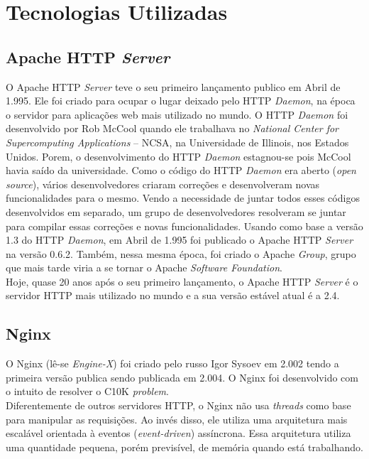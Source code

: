 \chapter{Tecnologias Utilizadas}\label{tecnologias_utilizadas}

\section{Apache HTTP \textit{Server}}
O Apache HTTP \textit{Server} teve o seu primeiro lançamento publico em Abril de 1.995. Ele foi criado para ocupar o lugar deixado pelo HTTP \textit{Daemon}, na época o servidor para aplicações web mais utilizado no mundo. O HTTP \textit{Daemon} foi desenvolvido por Rob McCool quando ele trabalhava no \textit{National Center for Supercomputing Applications} – NCSA, na Universidade de Illinois, nos Estados Unidos. Porem, o desenvolvimento do HTTP \textit{Daemon} estagnou-se pois McCool havia saído da universidade. Como o código do HTTP \textit{Daemon} era aberto (\textit{open source}), vários desenvolvedores criaram correções e desenvolveram novas funcionalidades para o mesmo. Vendo a necessidade de juntar todos esses códigos desenvolvidos em separado, um grupo de desenvolvedores resolveram se juntar para compilar essas correções e novas funcionalidades. Usando como base a versão 1.3 do HTTP \textit{Daemon}, em Abril de 1.995 foi publicado o Apache HTTP \textit{Server} na versão 0.6.2. Também, nessa mesma época, foi criado o Apache \textit{Group}, grupo que mais tarde viria a se tornar o Apache \textit{Software Foundation}.\\
Hoje, quase 20 anos após o seu primeiro lançamento, o Apache HTTP \textit{Server} é o servidor HTTP mais utilizado no mundo e a sua versão estável atual é a 2.4.\\

\section{Nginx}
O Nginx (lê-se \textit{Engine-X}) foi criado pelo russo Igor Sysoev em 2.002 tendo a primeira versão publica sendo publicada em 2.004. O Nginx foi desenvolvido com o intuito de resolver o C10K \textit{problem}.\\
Diferentemente de outros servidores HTTP, o Nginx não usa \textit{threads} como base para manipular as requisições. Ao invés disso, ele utiliza uma arquitetura mais escalável orientada à eventos (\textit{event-driven}) assíncrona. Essa arquitetura utiliza uma quantidade pequena, porém previsível, de memória quando está trabalhando.\\


